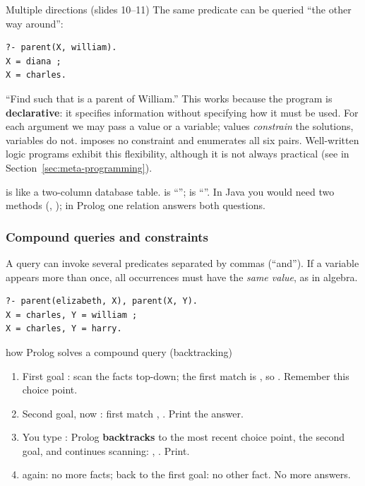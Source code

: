 \begin{nbfact}{Multiple directions (slides 10--11)}
The same predicate can be queried ``the other way around'':
\begin{verbatim}
?- parent(X, william).
X = diana ;
X = charles.
\end{verbatim}
``Find  such that  is a parent of William.'' This works because the program
is \textbf{declarative}: it specifies information without specifying how it must be used.
For each argument we may pass a value or a variable; values \emph{constrain} the solutions,
variables do not.  imposes no constraint and enumerates all six
pairs. Well-written logic programs exhibit this flexibility, although it is not always
practical (see  in Section~\ref{sec:meta-programming}).
\end{nbfact}

\begin{nbintuition}
\notinslides
{} is like a two-column database table.  is
``'';  is
``''. In Java you would need two methods
(, ); in Prolog one relation answers both questions.
\end{nbintuition}

\subsubsection{Compound queries and constraints}

A query can invoke several predicates separated by commas (``and''). If a variable appears
more than once, all occurrences must have the \emph{same value}, as in algebra.
\begin{verbatim}
?- parent(elizabeth, X), parent(X, Y).
X = charles, Y = william ;
X = charles, Y = harry.
\end{verbatim}

\begin{nbexample}{how Prolog solves a compound query (backtracking)}
\notinslides
\begin{enumerate}[nosep]
  \item First goal : scan the facts top-down; the first match is
        , so . Remember this choice point.
  \item Second goal, now : first match
        , . Print the answer.
  \item You type \code{;}: Prolog \textbf{backtracks} to the most recent choice point, the
        second goal, and continues scanning: ,
        . Print.
  \item \code{;} again: no more  facts; back to the first goal:
        no other  fact. No more answers.
\end{enumerate}
\end{nbexample}

